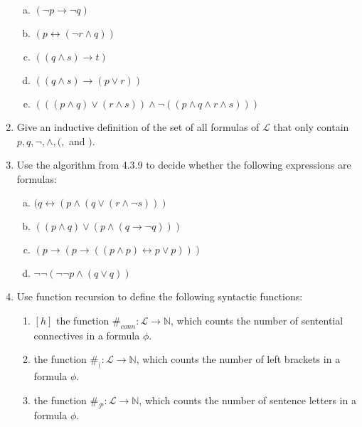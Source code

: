 \begin{enumerate}[\thesection.1]
\begin{enumerate}[(a)]
			\item $(\neg p\to \neg q)$
			
			\item $(p\leftrightarrow (\neg r\land q))$
			
			\item $((q\land s)\to t)$
		
			\item $((q\land s)\to (p\lor r))$
			
			\item $(((p\land q)\lor (r\land s))\land \neg ((p\land q\land r\land s)))$
		
		\end{enumerate}
		
		\item Give an inductive definition of the set of all formulas of $\mathcal{L}$ that only contain $p,q,\neg,\land,(,$ and $)$.
		
		\item Use the algorithm from 4.3.9 to decide whether the following expressions are formulas:
		
		\begin{enumerate}[(a)]
		
			\item $(q\leftrightarrow (p\land (q\lor (r\land \neg s)))$
		
			
			\item $((p\land q)\lor (p\land (q\to\neg q)))$
			
			\item $(p\to (p\to ((p\land p)\leftrightarrow p\lor p)))$
			
			\item $\neg\neg (\neg\neg p\land (q\lor q) )$
			
		\end{enumerate}
		
		\item Use function recursion to define the following syntactic functions:
		
		\begin{enumerate}
		
			\item $[h]$ the function $\#_{conn}:\mathcal{L}\to\mathbb{N}$, which counts the number of sentential connectives in a formula $\phi$.
			
			\item the function $\#_(:\mathcal{L}\to\mathbb{N}$, which counts the number of left brackets in a formula $\phi$. 
			
			\item the function $\#_{\mathcal{P}}:\mathcal{L}\to\mathbb{N}$, which counts the number of sentence letters in a formula $\phi$.
			

\end{enumerate}
\end{enumerate}
